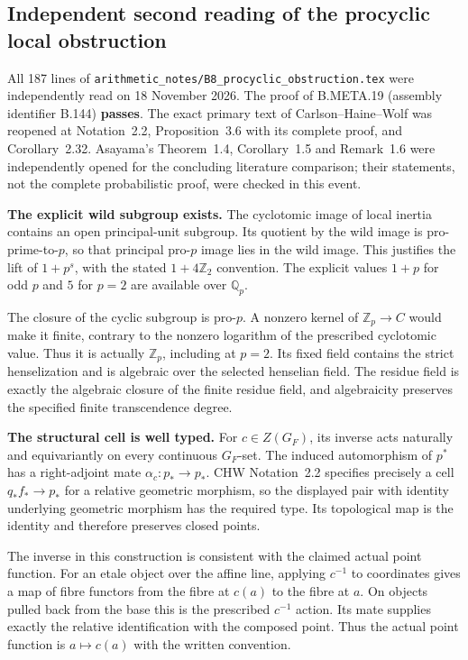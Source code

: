 \subsection*{Independent second reading of the procyclic local obstruction}

All 187 lines of
\texttt{arithmetic\_notes/B8\_procyclic\_obstruction.tex}
were independently read on 18 November 2026.
The proof of B.META.19 (assembly identifier B.144)
\textbf{passes}.  The exact primary text of
Carlson--Haine--Wolf was reopened at Notation~2.2,
Proposition~3.6 with its complete proof, and
Corollary~2.32.  Asayama's Theorem~1.4,
Corollary~1.5 and Remark~1.6 were independently
opened for the concluding literature comparison;
their statements, not the complete probabilistic
proof, were checked in this event.

\medskip\noindent\textbf{The explicit wild subgroup exists.}
The cyclotomic image of local inertia contains an
open principal-unit subgroup.  Its quotient by
the wild image is pro-prime-to-$p$, so that
principal pro-$p$ image lies in the wild image.
This justifies the lift of $1+p^s$, with the
stated $1+4\mathbb Z_2$ convention.  The explicit
values $1+p$ for odd $p$ and $5$ for $p=2$ are
available over $\mathbb Q_p$.

The closure of the cyclic subgroup is pro-$p$.
A nonzero kernel of $\mathbb Z_p\to C$ would
make it finite, contrary to the nonzero logarithm
of the prescribed cyclotomic value.  Thus it is
actually $\mathbb Z_p$, including at $p=2$.
Its fixed field contains the strict henselization
and is algebraic over the selected henselian
field.  The residue field is exactly the
algebraic closure of the finite residue field,
and algebraicity preserves the specified finite
transcendence degree.

\medskip\noindent\textbf{The structural cell is well typed.}
For $c\in Z(G_F)$, its inverse acts naturally
and equivariantly on every continuous $G_F$-set.
The induced automorphism of $p^*$ has a
right-adjoint mate $\alpha_c:p_*\to p_*$.
CHW Notation~2.2 specifies precisely a cell
$q_*f_*\to p_*$ for a relative geometric
morphism, so the displayed pair with identity
underlying geometric morphism has the required
type.  Its topological map is the identity and
therefore preserves closed points.

The inverse in this construction is consistent
with the claimed actual point function.  For an
etale object over the affine line, applying
$c^{-1}$ to coordinates gives a map of fibre
functors from the fibre at $c(a)$ to the fibre
at $a$.  On objects pulled back from the base
this is the prescribed $c^{-1}$ action.  Its
mate supplies exactly the relative identification
with the composed point.  Thus the actual
point function is $a\mapsto c(a)$ with the
written convention.

